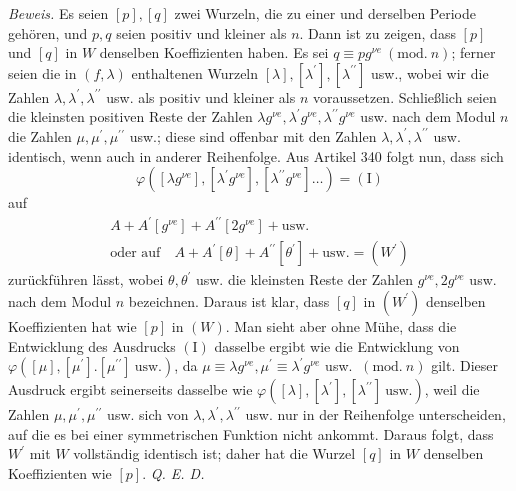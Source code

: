 \textit{Beweis.} Es seien \([p],\allowbreak [q]\) zwei Wurzeln, die zu einer und derselben Periode gehören, und \(p,\allowbreak q\) seien positiv und kleiner als \(n\). Dann ist zu zeigen, dass \([p]\) und \([q]\) in \(W\) denselben Koeffizienten haben. Es sei \(q\equiv pg^{\nu e}\ (\mathrm{mod.}\ n)\); ferner seien die in \((f,\allowbreak \lambda)\) enthaltenen Wurzeln \([\lambda],\allowbreak [\lambda^{\prime}],\allowbreak [\lambda^{\prime\prime}]\) usw., wobei wir die Zahlen \(\lambda,\allowbreak \lambda^{\prime},\allowbreak \lambda^{\prime\prime}\) usw. als positiv und kleiner als \(n\) voraussetzen. Schließlich seien die kleinsten positiven Reste der Zahlen \(\lambda g^{\nu e},\allowbreak \lambda^{\prime} g^{\nu e},\allowbreak \lambda^{\prime\prime} g^{\nu e}\) usw. nach dem Modul \(n\) die Zahlen \(\mu,\allowbreak \mu^{\prime},\allowbreak \mu^{\prime\prime}\) usw.; diese sind offenbar mit den Zahlen \(\lambda,\allowbreak \lambda^{\prime},\allowbreak \lambda^{\prime\prime}\) usw. identisch, wenn auch in anderer Reihenfolge. Aus Artikel 340 folgt nun, dass sich \[\varphi([\lambda g^{\nu e}],[\lambda^{\prime} g^{\nu e}],[\lambda^{\prime\prime} g^{\nu e}]\ldots)=(\mathrm I)\] auf \[\begin{gathered}
A+A^{\prime}[g^{\nu e}]+A^{\prime\prime}[2g^{\nu e}]+\mathrm{usw.}\\
\text{oder auf}\quad A+A^{\prime}[\theta]+A^{\prime\prime}[\theta^{\prime}]+\mathrm{usw.}=(W^{\prime})
\end{gathered}\] zurückführen lässt, wobei \(\theta,\allowbreak \theta^{\prime}\) usw. die kleinsten Reste der Zahlen \(g^{\nu e},\allowbreak 2g^{\nu e}\) usw. nach dem Modul \(n\) bezeichnen. Daraus ist klar, dass \([q]\) in \((W^{\prime})\) denselben Koeffizienten hat wie \([p]\) in \((W)\). Man sieht aber ohne Mühe, dass die Entwicklung des Ausdrucks \((\mathrm I)\) dasselbe ergibt wie die Entwicklung von \(\varphi([\mu],\allowbreak [\mu^{\prime}].[\mu^{\prime\prime}]\ \text{usw.})\), da \(\mu\equiv\lambda g^{\nu e},\allowbreak \mu^{\prime}\equiv\lambda^{\prime} g^{\nu e}\) usw. \(\ (\mathrm{mod.}\ n)\) gilt. Dieser Ausdruck ergibt seinerseits dasselbe wie \(\varphi([\lambda],\allowbreak [\lambda^{\prime}],\allowbreak [\lambda^{\prime\prime}]\ \text{usw.})\), weil die Zahlen \(\mu,\allowbreak \mu^{\prime},\allowbreak \mu^{\prime\prime}\) usw. sich von \(\lambda,\allowbreak \lambda^{\prime},\allowbreak \lambda^{\prime\prime}\) usw. nur in der Reihenfolge unterscheiden, auf die es bei einer symmetrischen Funktion nicht ankommt. Daraus folgt, dass \(W^{\prime}\) mit \(W\) vollständig identisch ist; daher hat die Wurzel \([q]\) in \(W\) denselben Koeffizienten wie \([p]\). \textit{Q. E. D.}

